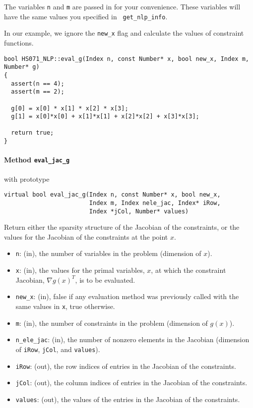 \documentclass[10pt]{article}
\begin{document}
The variables {\tt n} and {\tt m} are passed in for your convenience.
These variables will have the same values you specified in {\tt
  get\_nlp\_info}.

In our example, we ignore the {\tt new\_x} flag and calculate the
values of constraint functions.

\begin{footnotesize}
\begin{verbatim}
bool HS071_NLP::eval_g(Index n, const Number* x, bool new_x, Index m, Number* g)
{
  assert(n == 4);
  assert(m == 2);

  g[0] = x[0] * x[1] * x[2] * x[3];
  g[1] = x[0]*x[0] + x[1]*x[1] + x[2]*x[2] + x[3]*x[3];

  return true;
} 
\end{verbatim}
\end{footnotesize}

\paragraph{Method {\texttt{eval\_jac\_g}}} with prototype
\begin{verbatim}
virtual bool eval_jac_g(Index n, const Number* x, bool new_x,
                        Index m, Index nele_jac, Index* iRow, 
                        Index *jCol, Number* values)
\end{verbatim}
Return either the sparsity structure of the Jacobian of the
constraints, or the values for the Jacobian of the constraints at the
point $x$.
\begin{itemize}
\item {\tt n}: (in), the number of variables in the problem (dimension of $x$). 
\item {\tt x}: (in), the values for the primal variables, $x$, at which
  the constraint Jacobian, $\nabla g(x)^T$, is to be evaluated.
\item {\tt new\_x}: (in), false if any evaluation method was previously called 
        with the same values in {\tt x}, true otherwise.
\item {\tt m}: (in), the number of constraints in the problem (dimension of $g(x)$).
\item {\tt n\_ele\_jac}: (in), the number of nonzero elements in the 
        Jacobian (dimension of {\tt iRow}, {\tt jCol}, and {\tt values}).
\item {\tt iRow}: (out), the row indices of entries in the Jacobian of the constraints.
\item {\tt jCol}: (out), the column indices of entries in the Jacobian of the constraints.
\item {\tt values}: (out), the values of the entries in the Jacobian of the constraints.
\end{itemize}
\end{document}
